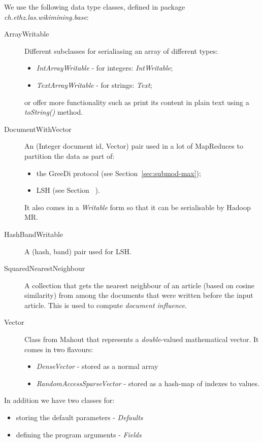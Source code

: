 We use the following data type classes, defined in package
\emph{ch.ethz.las.wikimining.base}:
\begin{description}
  \item[ArrayWritable] Different subclasses for serialiasing an array of
  different types:
    \begin{itemize}
      \item \emph{IntArrayWritable} - for integers: \emph{IntWritable};
      \item \emph{TextArrayWritable} - for strings: \emph{Text};
    \end{itemize}
  or offer more functionality such as print its content in plain text using a
  \emph{toString()} method.
  \item[DocumentWithVector] An (Integer document id, Vector) pair used in a lot
  of MapReduces to partition the data as part of:
    \begin{itemize}
      \item the GreeDi protocol (see Section~\vref{sec:submod-max});
      \item \acl{LSH} (see Section~ ).
    \end{itemize}
    It also comes in a \emph{Writable} form so that it can be serialisable by
    Hadoop \acl{MR}.
  \item[HashBandWritable] A (hash, band) pair used for \ac{LSH}.
  \item[SquaredNearestNeighbour] A collection that gets the nearest neighbour
  of an article (based on cosine similarity) from among the documents that were
  written before the input article. This is used to compute \emph{document
  influence}.
  \item[Vector] Class from Mahout that represents a \emph{double}-valued
  mathematical vector. It comes in two flavours:
  \begin{itemize}
    \item \emph{DenseVector} - stored as a normal array
    \item \emph{RandomAccessSparseVector} - stored as a hash-map of indexes to
    values.
  \end{itemize}
\end{description}

In addition we have two classes for:
\begin{itemize}
  \item storing the default parameters - \emph{Defaults}
  \item defining the program arguments - \emph{Fields}
\end{itemize}

